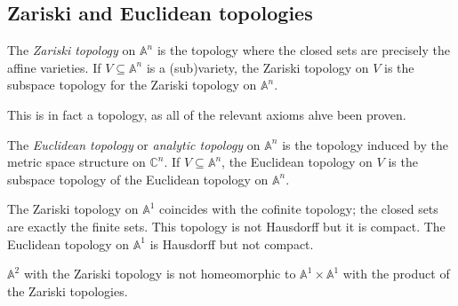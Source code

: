 \subsection{Zariski and Euclidean topologies}
\begin{definition}
    The \emph{Zariski topology} on \( \mathbb A^n \) is the topology where the closed sets are precisely the affine varieties.
    If \( V \subseteq \mathbb A^n \) is a (sub)variety, the Zariski topology on \( V \) is the subspace topology for the Zariski topology on \( \mathbb A^n \).
\end{definition}
\begin{remark}
    This is in fact a topology, as all of the relevant axioms ahve been proven.
\end{remark}
\begin{definition}
    The \emph{Euclidean topology} or \emph{analytic topology} on \( \mathbb A^n \) is the topology induced by the metric space structure on \( \mathbb C^n \).
    If \( V \subseteq \mathbb A^n \), the Euclidean topology on \( V \) is the subspace topology of the Euclidean topology on \( \mathbb A^n \).
\end{definition}
\begin{proposition}
    The Zariski topology on \( \mathbb A^1 \) coincides with the cofinite topology; the closed sets are exactly the finite sets.
    This topology is not Hausdorff but it is compact.
    The Euclidean topology on \( \mathbb A^1 \) is Hausdorff but not compact.
\end{proposition}
\begin{remark}
    \( \mathbb A^2 \) with the Zariski topology is not homeomorphic to \( \mathbb A^1 \times \mathbb A^1 \) with the product of the Zariski topologies.
\end{remark}

